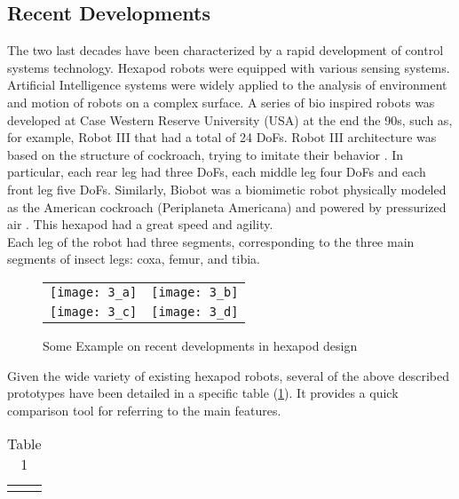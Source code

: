 \subsection{Recent Developments}
The two last decades have been characterized by a rapid development of control systems technology. Hexapod robots were equipped with various sensing systems. Artificial Intelligence systems were widely applied to the analysis of environment and motion of robots on a complex surface. A series of bio inspired robots was developed at Case Western Reserve University (USA) at the end the 90s, such as, for example, Robot III that had a total of 24 DoFs. Robot III architecture was based on the structure of cockroach, trying to imitate their behavior \cite{25h}. In particular, each rear leg had three DoFs, each middle leg four DoFs and each front leg five DoFs. Similarly, Biobot was a biomimetic robot physically modeled as the American cockroach (Periplaneta Americana) and powered by pressurized air \cite{26h}. This hexapod had a great speed and agility. \\
Each leg of the robot had three segments, corresponding to the three main segments of insect legs: coxa, femur, and tibia.
\begin{figure}[h]
    \centering
    \begin{tabular}{ l l }
        \texttt{[image: 3\_a]} & 
        \texttt{[image: 3\_b]} \\ 
        \texttt{[image: 3\_c]} & 
        \texttt{[image: 3\_d]} \\ 
    \end{tabular}
    \caption{Some Example on recent developments in hexapod design}
    \label{fig3}
\end{figure}
Given the wide variety of existing hexapod robots, several of the above described prototypes have been detailed in a specific table (\ref{tbl:table1}). It provides a quick comparison tool for referring to the main features.
\begin{table}[h]
       \caption{Table 1}
       \centering
\begin{tabular}{|c|c|}
    \hline 
    &  \\ 
    \hline 
    &  \\ 
    \hline 
\end{tabular} 
\label{tbl:table1}
\end{table}

